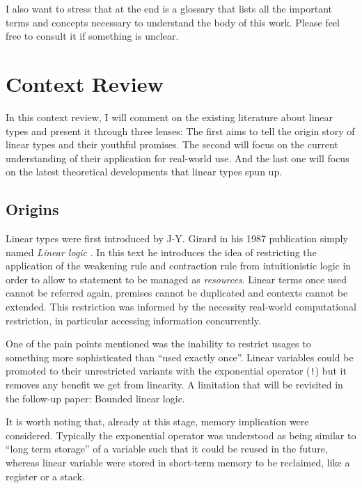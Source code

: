 \documentclass[
]{article}
\begin{document}
I also want to stress that at the end is a glossary that lists all the
important terms and concepts necessary to understand the body of this
work. Please feel free to consult it if something is unclear.

\newpage

\hypertarget{context-review}{%
\section{Context Review}\label{context-review}}

In this context review, I will comment on the existing literature about
linear types and present it through three lenses: The first aims to tell
the origin story of linear types and their youthful promises. The second
will focus on the current understanding of their application for
real-world use. And the last one will focus on the latest theoretical
developments that linear types spun up.

\hypertarget{origins}{%
\subsection{Origins}\label{origins}}

Linear types were first introduced by J-Y. Girard in his
1987\cite{linear-logic} publication simply named \emph{Linear logic} .
In this text he introduces the idea of restricting the application of
the weakening rule and contraction rule from intuitionistic logic in
order to allow to statement to be managed as \emph{resources}. Linear
terms once used cannot be referred again, premises cannot be duplicated
and contexts cannot be extended. This restriction was informed by the
necessity real-world computational restriction, in particular accessing
information concurrently.

One of the pain points mentioned was the inability to restrict usages to
something more sophisticated than ``used exactly once''. Linear
variables could be promoted to their unrestricted variants with the
exponential operator (\texttt{!}) but it removes any benefit we get from
linearity. A limitation that will be revisited in the follow-up paper:
Bounded linear logic.

It is worth noting that, already at this stage, memory implication were
considered. Typically the exponential operator was understood as being
similar to ``long term storage'' of a variable such that it could be
reused in the future, whereas linear variable were stored in short-term
memory to be reclaimed, like a register or a stack.
\end{document}
